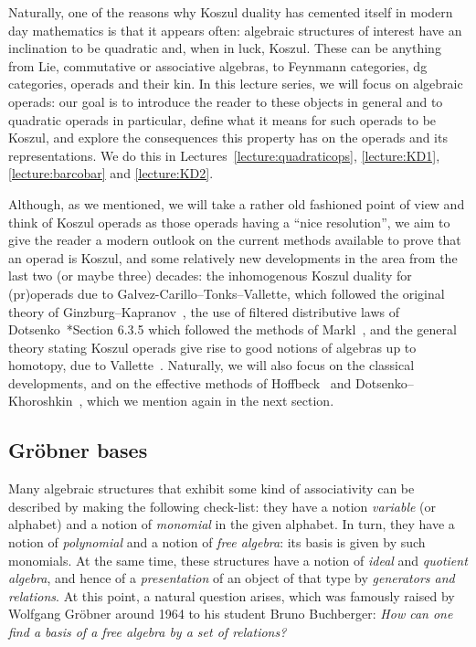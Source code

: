 Naturally, one of the reasons why Koszul duality has cemented
itself in modern day mathematics is that it appears often:
algebraic structures of interest have an inclination to be
quadratic and, when in luck, Koszul. These can be anything
from Lie, commutative or associative algebras, to Feynmann
categories, dg categories, operads and their kin. In this
lecture series, we will focus on algebraic operads: our goal
is to introduce the reader to these objects in general
and to quadratic operads in particular, define what
it means for such operads to be Koszul, and explore
the consequences this property has on the operads
and its representations. We do this in Lectures~\ref{lecture:quadraticops}, \ref{lecture:KD1}, \ref{lecture:barcobar} and \ref{lecture:KD2}.

Although, as we
mentioned, we will take a rather old fashioned point of 
view and think of Koszul operads as those operads 
having a ``nice resolution'', we aim to give the reader
a modern outlook on the current methods available to
prove that an operad is Koszul, and some relatively 
new developments in the area from the last two (or
maybe three) decades:
the inhomogenous Koszul duality for (pr)operads due
to Galvez-Carillo--Tonks--Vallette, which
followed the original theory of Ginzburg--Kapranov~\cite{Ginzburg1994},
the use of filtered distributive laws of Dotsenko~\cite{Bremner2016}*{Section 6.3.5}
which followed the methods of Markl~\cite{MarklDistributive}, and the general
theory stating Koszul operads give rise to good
notions of algebras up to homotopy, due to Vallette~\cite{Vallette2020}.
Naturally, we will also focus on the classical developments,
and on the effective methods of Hoffbeck~\cite{Hoffbeck2009} and 
Dotsenko--Khoroshkin~\cite{Dotsenko2010}, which we mention again in
the next section.

\subsection{Gr\"obner bases}
Many algebraic structures that exhibit some kind of 
associativity can be described by making the following check-list:
they have a notion \emph{variable} (or alphabet) and a notion 
of \emph{monomial} in the given alphabet. In turn, they have
a notion of \emph{polynomial} and a notion of \emph{free algebra}:
its basis is given by such monomials.
At the same time, these structures have a notion of \emph{ideal} and
\emph{quotient algebra}, and hence of a \emph{presentation} of an object of that
type by \emph{generators and relations}.
At this point, a natural question arises, which was 
famously raised by Wolfgang Gr\"obner around 1964 to his student Bruno
Buchberger: \emph{How can one find a basis of a free algebra by
a set of relations?} 

